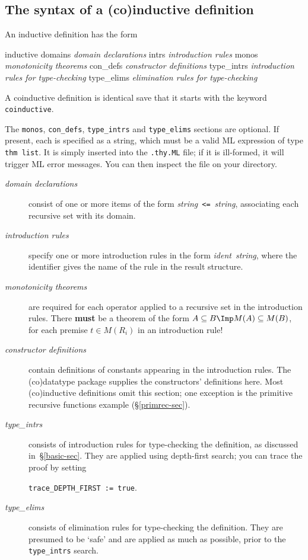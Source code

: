 \subsection{The syntax of a (co)inductive definition}
An inductive definition has the form
\begin{ttbox}
inductive
  domains    {\it domain declarations}
  intrs      {\it introduction rules}
  monos      {\it monotonicity theorems}
  con_defs   {\it constructor definitions}
  type_intrs {\it introduction rules for type-checking}
  type_elims {\it elimination rules for type-checking}
\end{ttbox}
A coinductive definition is identical save that it starts with the keyword
{\tt coinductive}.  

The {\tt monos}, {\tt con\_defs}, {\tt type\_intrs} and {\tt type\_elims}
sections are optional.  If present, each is specified as a string, which
must be a valid ML expression of type {\tt thm list}.  It is simply
inserted into the {\tt .thy.ML} file; if it is ill-formed, it will trigger
ML error messages.  You can then inspect the file on your directory.

\begin{description}
\item[\it domain declarations] consist of one or more items of the form
  {\it string\/}~{\tt <=}~{\it string}, associating each recursive set with
  its domain.

\item[\it introduction rules] specify one or more introduction rules in
  the form {\it ident\/}~{\it string}, where the identifier gives the name of
  the rule in the result structure.

\item[\it monotonicity theorems] are required for each operator applied to
  a recursive set in the introduction rules.  There {\bf must} be a theorem
  of the form $A\sbs B\Imp M(A)\sbs M(B)$, for each premise $t\in M(R_i)$
  in an introduction rule!

\item[\it constructor definitions] contain definitions of constants
  appearing in the introduction rules.  The (co)datatype package supplies
  the constructors' definitions here.  Most (co)inductive definitions omit
  this section; one exception is the primitive recursive functions example
  (\S\ref{primrec-sec}).

\item[\it type\_intrs] consists of introduction rules for type-checking the
  definition, as discussed in~\S\ref{basic-sec}.  They are applied using
  depth-first search; you can trace the proof by setting

  \verb|trace_DEPTH_FIRST := true|.

\item[\it type\_elims] consists of elimination rules for type-checking the
  definition.  They are presumed to be `safe' and are applied as much as
  possible, prior to the {\tt type\_intrs} search.
\end{description}

